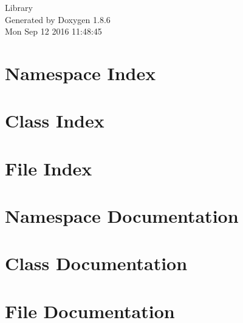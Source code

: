 \documentclass[twoside]{book}
\newcommand{\clearemptydoublepage}{%
  \newpage{\pagestyle{empty}\cleardoublepage}%
}
\begin{document}
\begin{titlepage}
\vspace*{7cm}
\begin{center}%
{\Large Library }\\
\vspace*{1cm}
{\large Generated by Doxygen 1.8.6}\\
\vspace*{0.5cm}
{\small Mon Sep 12 2016 11:48:45}\\
\end{center}
\end{titlepage}
\clearemptydoublepage
\tableofcontents
\clearemptydoublepage
{}

\chapter{Namespace Index}

\chapter{Class Index}

\chapter{File Index}

\chapter{Namespace Documentation}

\chapter{Class Documentation}









\chapter{File Documentation}























\newpage
{}
{}
\printindex
\end{document}
